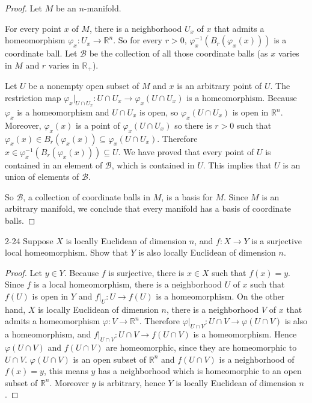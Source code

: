 \begin{proof}
	Let $M$ be an $n$-manifold.

	For every point $x$ of $M$, there is a neighborhood $U_{x}$ of $x$ that admits a homeomorphism $\varphi_{x}: U_{x}\to \mathbb{R}^{n}$. So for every $r > 0$, $\varphi_{x}^{-1}(B_{r}(\varphi_{x}(x)))$ is a coordinate ball. Let $\mathscr{B}$ be the collection of all those coordinate balls (as $x$ varies in $M$ and $r$ varies in $\mathbb{R}_{+}$).

	Let $U$ be a nonempty open subset of $M$ and $x$ is an arbitrary point of $U$. The restriction map $\varphi_{x}\vert_{U\cap U_{x}}: U\cap U_{x}\to \varphi_{x}(U\cap U_{x})$ is a homeomorphism. Because $\varphi_{x}$ is a homeomorphism and $U\cap U_{x}$ is open, so $\varphi_{x}(U\cap U_{x})$ is open in $\mathbb{R}^{n}$. Moreover, $\varphi_{x}(x)$ is a point of $\varphi_{x}(U\cap U_{x})$ so there is $r > 0$ such that $\varphi_{x}(x)\in B_{r}(\varphi_{x}(x))\subseteq \varphi_{x}(U\cap U_{x})$. Therefore $x\in \varphi_{x}^{-1}(B_{r}(\varphi_{x}(x)))\subseteq U$. We have proved that every point of $U$ is contained in an element of $\mathscr{B}$, which is contained in $U$. This implies that $U$ is an union of elements of $\mathscr{B}$.

	So $\mathscr{B}$, a collection of coordinate balls in $M$, is a basis for $M$. Since $M$ is an arbitrary manifold, we conclude that every manifold has a basis of coordinate balls.
\end{proof}

\begin{problem}{2-24}
Suppose $X$ is locally Euclidean of dimension $n$, and $f: X\to Y$ is a surjective local homeomorphism. Show that $Y$ is also locally Euclidean of dimension $n$.
\end{problem}

\begin{proof}
	Let $y\in Y$. Because $f$ is surjective, there is $x\in X$ such that $f(x) = y$. Since $f$ is a local homeomorphism, there is a neighborhood $U$ of $x$ such that $f(U)$ is open in $Y$ and $f\vert_{U}: U\to f(U)$ is a homeomorphism. On the other hand, $X$ is locally Euclidean of dimension $n$, there is a neighborhood $V$ of $x$ that admits a homeomorphism $\varphi: V\to \mathbb{R}^{n}$. Therefore $\varphi\vert_{U\cap V}: U\cap V\to \varphi(U\cap V)$ is also a homeomorphism, and $f\vert_{U\cap V}: U\cap V\to f(U\cap V)$ is a homeomorphism. Hence $\varphi(U\cap V)$ and $f(U\cap V)$ are homeomorphic, since they are homeomorphic to $U\cap V$. $\varphi(U\cap V)$ is an open subset of $\mathbb{R}^{n}$ and $f(U\cap V)$ is a neighborhood of $f(x) = y$, this means $y$ has a neighborhood which is homeomorphic to an open subset of $\mathbb{R}^{n}$. Moreover $y$ is arbitrary, hence $Y$ is locally Euclidean of dimension $n$.
\end{proof}

